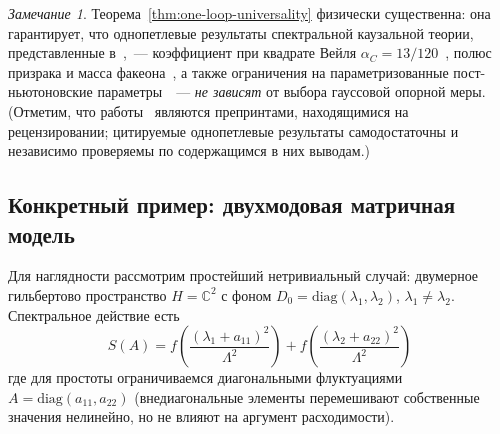 \documentclass[12pt,a4paper]{article}
\theoremstyle{plain}
\theoremstyle{definition}
\theoremstyle{remark}
\newtheorem{remark}[theorem]{Замечание}
\newcommand{\Lam}{\Lambda}
\begin{document}
\begin{remark}\label{rem:universality-consequence}
Теорема~\ref{thm:one-loop-universality} физически существенна: она
гарантирует, что однопетлевые результаты спектральной каузальной теории,
представленные в~\cite{Alfyorov:2026ff,Alfyorov:2026ss,Alfyorov:2026ct},~---
коэффициент при квадрате Вейля
$\alpha_C = 13/120$~\cite{Alfyorov:2026ff}, полюс призрака и
масса факеона~\cite{AlfyorovShnyukov:2026ns}, а также ограничения
на параметризованные пост-ньютоновские
параметры~\cite{Alfyorov:2026ss}~--- \emph{не зависят} от выбора
гауссовой опорной меры.
(Отметим, что работы~\cite{Alfyorov:2026ff,Alfyorov:2026ss,%
AlfyorovShnyukov:2026ns} являются препринтами, находящимися на
рецензировании; цитируемые однопетлевые результаты самодостаточны
и независимо проверяемы по содержащимся в них выводам.)
\end{remark}

\subsection{Конкретный пример: двухмодовая матричная модель}
\label{subsec:example}

Для наглядности рассмотрим простейший нетривиальный случай:
двумерное гильбертово пространство $H = \mathbb{C}^2$ с фоном
$D_0 = \mathrm{diag}(\lambda_1, \lambda_2)$,
$\lambda_1 \ne \lambda_2$.  Спектральное действие есть
\begin{equation}
  S(A) = f\!\left(\frac{(\lambda_1+a_{11})^2}{\Lam^2}\right)
       + f\!\left(\frac{(\lambda_2+a_{22})^2}{\Lam^2}\right)
\end{equation}
где для простоты ограничиваемся диагональными флуктуациями
$A = \mathrm{diag}(a_{11}, a_{22})$ (внедиагональные элементы
перемешивают собственные значения нелинейно, но не влияют на
аргумент расходимости).
\end{document}
